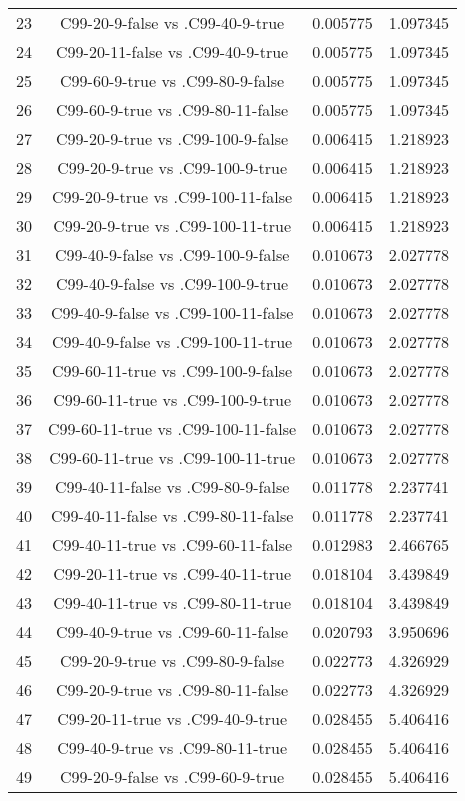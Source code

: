 \documentclass[a4paper,10pt]{article}
\begin{document}
\begin{landscape}
\begin{table}[!htp]
\begin{tabular}{cccc}
23&C99-20-9-false vs .C99-40-9-true&0.005775&1.097345\\
24&C99-20-11-false vs .C99-40-9-true&0.005775&1.097345\\
25&C99-60-9-true vs .C99-80-9-false&0.005775&1.097345\\
26&C99-60-9-true vs .C99-80-11-false&0.005775&1.097345\\
27&C99-20-9-true vs .C99-100-9-false&0.006415&1.218923\\
28&C99-20-9-true vs .C99-100-9-true&0.006415&1.218923\\
29&C99-20-9-true vs .C99-100-11-false&0.006415&1.218923\\
30&C99-20-9-true vs .C99-100-11-true&0.006415&1.218923\\
31&C99-40-9-false vs .C99-100-9-false&0.010673&2.027778\\
32&C99-40-9-false vs .C99-100-9-true&0.010673&2.027778\\
33&C99-40-9-false vs .C99-100-11-false&0.010673&2.027778\\
34&C99-40-9-false vs .C99-100-11-true&0.010673&2.027778\\
35&C99-60-11-true vs .C99-100-9-false&0.010673&2.027778\\
36&C99-60-11-true vs .C99-100-9-true&0.010673&2.027778\\
37&C99-60-11-true vs .C99-100-11-false&0.010673&2.027778\\
38&C99-60-11-true vs .C99-100-11-true&0.010673&2.027778\\
39&C99-40-11-false vs .C99-80-9-false&0.011778&2.237741\\
40&C99-40-11-false vs .C99-80-11-false&0.011778&2.237741\\
41&C99-40-11-true vs .C99-60-11-false&0.012983&2.466765\\
42&C99-20-11-true vs .C99-40-11-true&0.018104&3.439849\\
43&C99-40-11-true vs .C99-80-11-true&0.018104&3.439849\\
44&C99-40-9-true vs .C99-60-11-false&0.020793&3.950696\\
45&C99-20-9-true vs .C99-80-9-false&0.022773&4.326929\\
46&C99-20-9-true vs .C99-80-11-false&0.022773&4.326929\\
47&C99-20-11-true vs .C99-40-9-true&0.028455&5.406416\\
48&C99-40-9-true vs .C99-80-11-true&0.028455&5.406416\\
49&C99-20-9-false vs .C99-60-9-true&0.028455&5.406416\\

\end{tabular}
\end{table}
\end{landscape}
\end{document}
